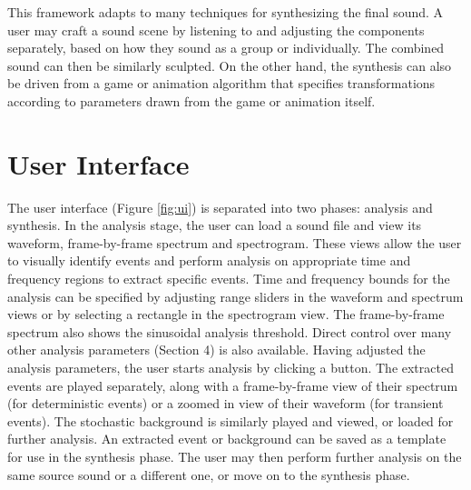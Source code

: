 \documentclass[twoside]{article}
\begin{document}
This framework adapts to many techniques for synthesizing the final sound. A user may 
craft a sound scene by listening to and adjusting the components separately, based on how they 
sound as a group or individually. The combined sound can then be similarly sculpted. On the other 
hand, the synthesis can also be driven from a game or animation algorithm that specifies 
transformations according to parameters drawn from the game or animation itself.

\section{User Interface}

The user interface (Figure \ref{fig:ui}) is separated into two phases: analysis and 
synthesis. In the analysis stage, the user can load a sound file and view its waveform, 
frame-by-frame spectrum and spectrogram. These views allow the user to visually 
identify events and perform analysis on appropriate time and frequency regions to 
extract specific events. Time and frequency 
bounds for the analysis can be specified by adjusting range sliders in the waveform 
and spectrum views or by selecting a rectangle in the spectrogram view. The frame-by-frame 
spectrum also shows the sinusoidal analysis threshold. Direct 
control over many other analysis parameters (Section 4) is also available. 
Having adjusted the analysis parameters, the user starts analysis by clicking a button. 
The extracted events are played separately, along with a frame-by-frame view of 
their spectrum (for deterministic events) or a zoomed in view of their 
waveform (for transient events). The stochastic background is similarly 
played and viewed, or loaded for further analysis. An 
extracted event or background can be saved as a template for use in 
the synthesis phase. The user may then perform further analysis on the same source sound or 
a different one, or move on to the synthesis phase.
\end{document}
